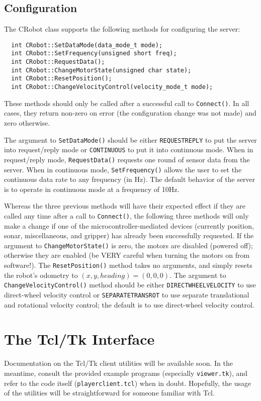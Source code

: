 \documentclass[11pt]{article}
\begin{document}
\subsection{Configuration}
The CRobot class supports the following methods for configuring the 
server:

\begin{verbatim}
  int CRobot::SetDataMode(data_mode_t mode);
  int CRobot::SetFrequency(unsigned short freq);
  int CRobot::RequestData();
  int CRobot::ChangeMotorState(unsigned char state);
  int CRobot::ResetPosition();
  int CRobot::ChangeVelocityControl(velocity_mode_t mode);
\end{verbatim}

These methods should only be called after a successful call to
{\tt Connect()}.  In all cases, they return non-zero on error
(the configuration change was not made) and zero otherwise.

The argument to {\tt SetDataMode()} should be either {\tt REQUESTREPLY}
to put the server into request/reply mode or {\tt CONTINUOUS} to 
put it into continuous mode. When in request/reply mode,
{\tt RequestData()} requests one round of sensor data from the server.
When in continuous mode, {\tt SetFrequency()} allows
the user to set the continuous data rate to any frequency (in Hz). 
The default behavior of the server is to operate in continuous mode
at a frequency of 10Hz. 

Whereas the three previous methods will have their expected effect
if they are called any time after a call to {\tt Connect()}, the
following three methods will only make a change if one of the
microcontroller-mediated devices (currently position, sonar, miscellaneous,
and gripper) has already been successfully requested.
If the argument to {\tt ChangeMotorState()} is zero, the motors
are disabled (powered off); otherwise they are enabled (be VERY careful
when turning the motors on from software!).  The {\tt ResetPosition()}
method takes no arguments, and simply resets the robot's 
odometry to $(x,y,heading) = (0,0,0)$.
 The argument to {\tt ChangeVelocityControl()}
method should be either {\tt DIRECTWHEELVELOCITY} to use direct-wheel
velocity control or {\tt SEPARATETRANSROT} to use separate
translational and rotational velocity control; the default is to
use direct-wheel velocity control.

\newpage
\section{The Tcl/Tk Interface}
Documentation on the Tcl/Tk client utilities will be available soon.
In the meantime, consult the provided example programs (especially
{\tt viewer.tk}), and refer to the code itself ({\tt playerclient.tcl})
when in doubt.  Hopefully, the usage of the utilities will be straightforward 
for someone familiar with Tcl.
\end{document}
